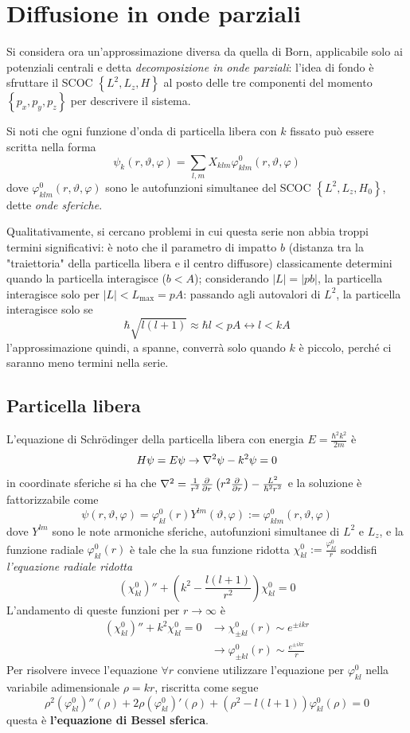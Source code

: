 \section{Diffusione in onde parziali}
Si considera ora un'approssimazione diversa da quella di Born, applicabile solo ai potenziali centrali
e detta \textit{decomposizione in onde parziali}: l'idea di fondo è sfruttare il SCOC
$\left\{L^2,L_z,H\right\}$ al posto delle tre componenti del momento $\left\{p_x,p_y,p_z\right\}$ per
descrivere il sistema.

Si noti che ogni funzione d'onda di particella libera con $k$ fissato può essere scritta
nella forma
$$\psi_k(r,\vartheta,\varphi)=\sum_{l,m}X_{klm}\varphi^0_{klm}(r,\vartheta,\varphi)$$
dove $\varphi^0_{klm}(r,\vartheta,\varphi)$ sono le autofunzioni simultanee del SCOC 
$\left\{L^2,L_z,H_0\right\}$, dette
\textit{onde sferiche}.

Qualitativamente, si cercano problemi in cui questa serie non abbia troppi termini significativi:
è noto che il parametro di impatto $b$ (distanza tra la "traiettoria" della particella libera e il
centro diffusore) classicamente determini quando la particella interagisce ($b<A$); considerando
$|L|=|pb|$, la particella interagisce solo per $|L|<L_\text{max} = pA$: passando agli autovalori di $L^2$,
la particella interagisce solo se
$$\hbar\sqrt{l(l+1)}\approx\hbar l<pA \leftrightarrow l<kA$$
l'approssimazione quindi, a spanne, converrà solo quando $k$ è piccolo, perché ci saranno meno termini
nella serie.
\subsection{Particella libera}
L'equazione di Schrödinger della particella libera con energia $E=\frac{\hbar^2k^2}{2m}$ è
$$H\psi = E\psi\rightarrow \laplacian\psi - k^2\psi = 0$$
in coordinate sferiche si ha che $\laplacian = \frac{1}{r^2}\pdv[]{}{r}\left(r^2\pdv[]{}{r}\right)-
\frac{L^2}{\hbar^2r^2}$ e la soluzione è fattorizzabile come
$$\psi(r,\vartheta,\varphi) = \varphi^0_{kl}(r)Y^{lm}(\vartheta,\varphi):=
\varphi^0_{klm}(r,\vartheta,\varphi)$$
dove $Y^{lm}$ sono le note armoniche sferiche, autofunzioni simultanee di $L^2$ e $L_z$, e la funzione
radiale $\varphi^0_{kl}(r)$ è tale che la sua funzione ridotta $\chi^0_{kl}:=\frac{\varphi^0_{kl}}{r}$
soddisfi \textit{l'equazione radiale ridotta}
$$(\chi^{0}_{kl})'' + \left(k^2-\frac{l(l+1)}{r^2}\right)\chi^0_{kl} = 0$$
L'andamento di queste funzioni per $r\to\infty$ è
\begin{align*}
    (\chi^0_{kl})'' + k^2\chi^0_{kl}=0&\rightarrow\chi_{\pm kl}^0(r)\sim e^{\pm ikr}\\
				      &\rightarrow\varphi^0_{\pm kl}(r)\sim \frac{e^{\pm ikr}}{r}
\end{align*}
Per risolvere invece l'equazione $\forall r$ conviene utilizzare l'equazione per $\varphi_{kl}^0$ nella
variabile adimensionale $\rho=kr$, riscritta come segue
$$\rho^2(\varphi^0_{kl})''(\rho)+2\rho(\varphi^0_{kl})'(\rho)+(\rho^2 - l(l+1))\varphi^0_{kl}(\rho)=0$$
questa è \textbf{l'equazione di Bessel sferica}.
